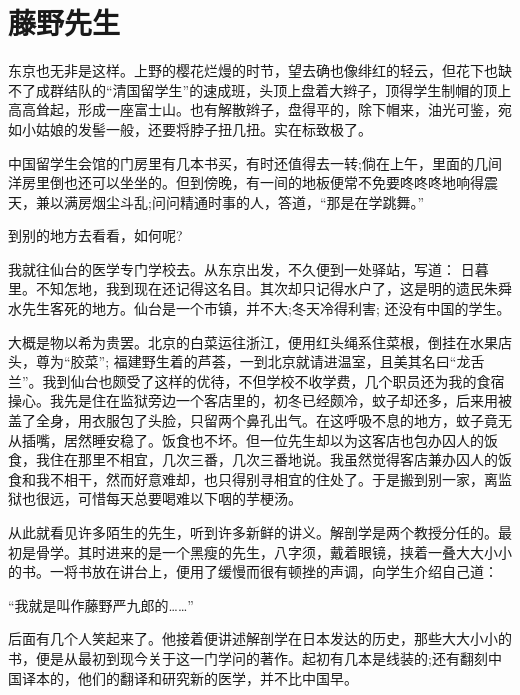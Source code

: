 \chapter*{藤野先生} %

    东京也无非是这样。上野的樱花烂熳的时节，望去确也像绯红的轻云，但花下也缺不了成群结队的“清国留学生”的速成班，头顶上盘着大辫子，顶得学生制帽的顶上高高耸起，形成一座富士山。也有解散辫子，盘得平的，除下帽来，油光可鉴，宛如小姑娘的发髻一般，还要将脖子扭几扭。实在标致极了。

    中国留学生会馆的门房里有几本书买，有时还值得去一转;倘在上午，里面的几间洋房里倒也还可以坐坐的。但到傍晚，有一间的地板便常不免要咚咚咚地响得震天，兼以满房烟尘斗乱;问问精通时事的人，答道，“那是在学跳舞。”

    到别的地方去看看，如何呢?

    我就往仙台的医学专门学校去。从东京出发，不久便到一处驿站，写道： 日暮里。不知怎地，我到现在还记得这名目。其次却只记得水户了，这是明的遗民朱舜水先生客死的地方。仙台是一个市镇，并不大;冬天冷得利害; 还没有中国的学生。

    大概是物以希为贵罢。北京的白菜运往浙江，便用红头绳系住菜根，倒挂在水果店头，尊为“胶菜”; 福建野生着的芦荟，一到北京就请进温室，且美其名曰“龙舌兰”。我到仙台也颇受了这样的优待，不但学校不收学费，几个职员还为我的食宿操心。我先是住在监狱旁边一个客店里的，初冬已经颇冷，蚊子却还多，后来用被盖了全身，用衣服包了头脸，只留两个鼻孔出气。在这呼吸不息的地方，蚊子竟无从插嘴，居然睡安稳了。饭食也不坏。但一位先生却以为这客店也包办囚人的饭食，我住在那里不相宜，几次三番，几次三番地说。我虽然觉得客店兼办囚人的饭食和我不相干，然而好意难却，也只得别寻相宜的住处了。于是搬到别一家，离监狱也很远，可惜每天总要喝难以下咽的芋梗汤。

    从此就看见许多陌生的先生，听到许多新鲜的讲义。解剖学是两个教授分任的。最初是骨学。其时进来的是一个黑瘦的先生，八字须，戴着眼镜，挟着一叠大大小小的书。一将书放在讲台上，便用了缓慢而很有顿挫的声调，向学生介绍自己道：

    “我就是叫作藤野严九郎的……”

    后面有几个人笑起来了。他接着便讲述解剖学在日本发达的历史，那些大大小小的书，便是从最初到现今关于这一门学问的著作。起初有几本是线装的;还有翻刻中国译本的，他们的翻译和研究新的医学，并不比中国早。

